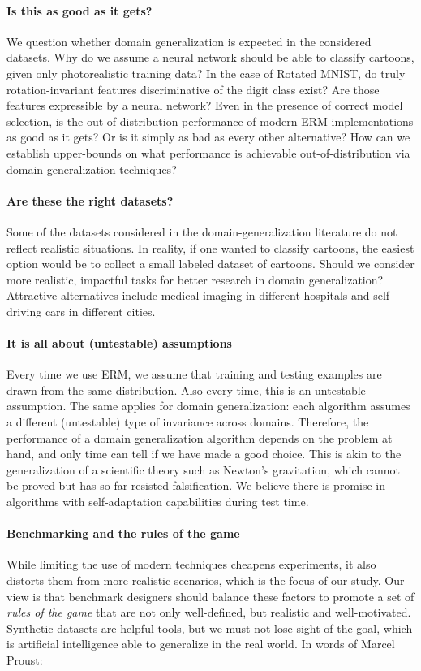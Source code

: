 \documentclass{article}
\begin{document}
\paragraph{Is this as good as it gets?}
We question whether domain generalization is expected in the considered datasets.
Why do we assume a neural network should be able to classify cartoons, given only photorealistic training data?
In the case of Rotated MNIST, do truly rotation-invariant features discriminative of the digit class exist? Are those features expressible by a neural network?
Even in the presence of correct model selection, is the out-of-distribution performance of modern ERM implementations as good as it gets?
Or is it simply as bad as every other alternative?
How can we establish upper-bounds on what performance is achievable out-of-distribution via domain generalization techniques?

\paragraph{Are these the right datasets?}
Some of the datasets considered in the domain-generalization literature do not reflect realistic situations.
In reality, if one wanted to classify cartoons, the easiest option would be to collect a small labeled dataset of cartoons.
Should we consider more realistic, impactful tasks for better research in domain generalization? 
Attractive alternatives include medical imaging in different hospitals and self-driving cars in different cities.

\paragraph{It is all about (untestable) assumptions}
Every time we use ERM, we assume that training and testing examples are drawn from the same distribution.
Also every time, this is an untestable assumption.
The same applies for domain generalization: each algorithm assumes a different (untestable) type of invariance across domains.
Therefore, the performance of a domain generalization algorithm depends on the problem at hand, and only time can tell if we have made a good choice.
This is akin to the generalization of a scientific theory such as Newton's gravitation, which cannot be proved but has so far resisted falsification.
We believe there is promise in algorithms with self-adaptation capabilities during test time.

\paragraph{Benchmarking and the rules of the game}
While limiting the use of modern techniques cheapens experiments, it also distorts them from more realistic scenarios, which is the focus of our study.
Our view is that benchmark designers should balance these factors to promote a set of \emph{rules of the game} that are not only well-defined, but realistic and well-motivated.
Synthetic datasets are helpful tools, but we must not lose sight of the goal, which is artificial intelligence able to generalize in the real world.
In words of Marcel Proust:
\end{document}
